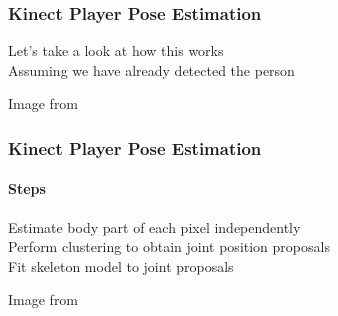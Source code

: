\documentclass[xetex,professionalfont]{beamer}
\begin{document}
\begin{frame}
\frametitle{Kinect Player Pose Estimation}

Let's take a look at how this works\\\medskip
Assuming we have already detected the person


\bigskip
\begin{center}
    {\centering Image from \cite{shotton2011}}
\end{center}

\end{frame}


\begin{frame}
\frametitle{Kinect Player Pose Estimation}
\framesubtitle{Steps}

Estimate body part of each pixel independently\\\medskip
Perform clustering to obtain joint position proposals\\\medskip
Fit skeleton model to joint proposals

\bigskip
\begin{center}
    {\centering Image from \cite{shotton2011}}
\end{center}

\end{frame}

\end{document}
